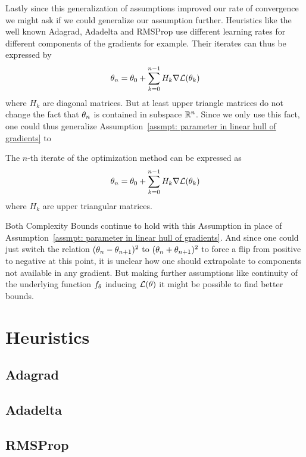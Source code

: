 Lastly since this generalization of assumptions improved our rate of convergence
we might ask if we could generalize our assumption further. Heuristics like
the well known Adagrad, Adadelta and RMSProp use different learning rates for
different components of the gradients for example. Their iterates can thus
be expressed by
%
\begin{align*}
	\theta_n = \theta_0 + \sum_{k=0}^{n-1} H_k \nabla\mathcal{L}(\theta_k)
\end{align*}
%
where \(H_k\) are diagonal matrices. But at least upper triangle matrices do
not change the fact that \(\theta_n\) is contained in subspace \(\mathbb{R}^n\).
Since we only use this fact, one could thus generalize Assumption~\ref{assmpt:
parameter in linear hull of gradients} to
%
\begin{assumption}\label{assmpt: parameter in generalized linear hull of gradients}
	The \(n\)-th iterate of the optimization method can be expressed as
	\begin{align*}
		\theta_n = \theta_0 + \sum_{k=0}^{n-1} H_k \nabla\mathcal{L}(\theta_k)
	\end{align*}
	where \(H_k\) are upper triangular matrices.
\end{assumption}

Both Complexity Bounds continue to hold with this Assumption in place of
Assumption~\ref{assmpt: parameter in linear hull of gradients}. And since one
could just switch the relation \((\theta_n-\theta_{n+1})^2\) to
\((\theta_n+\theta_{n+1})^2\) to force a flip from positive to negative
at this point, it is unclear how one should extrapolate to components not
available in any gradient. But making further assumptions like continuity of
the underlying function \(f_{\theta}\) inducing \(\mathcal{L}(\theta)\) it might
be possible to find better bounds.

\section{Heuristics}

\subsection{Adagrad}

\subsection{Adadelta}

\subsection{RMSProp}


\endinput